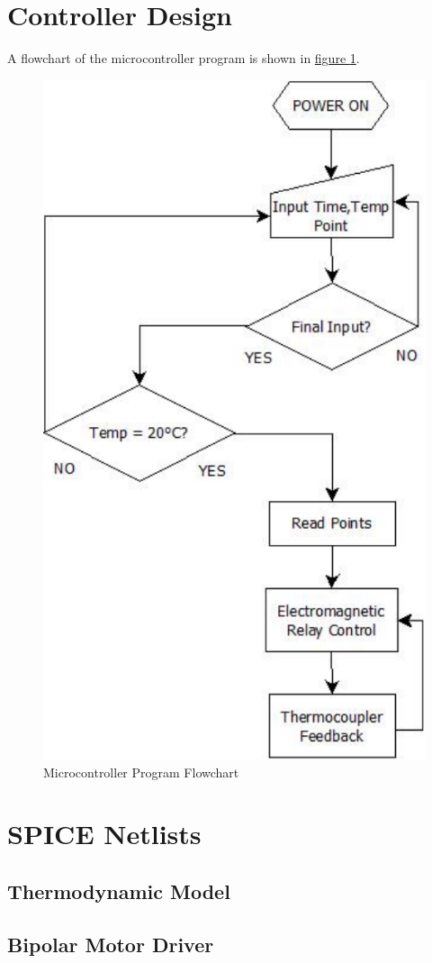 \documentclass[10pt, twocolumn]{article}
\begin{document}
\section{Controller Design}

A flowchart of the microcontroller program is shown in
\hyperref[program-flowchart]{figure \ref{program-flowchart}}.

\begin{figure}
	\centering
	\includegraphics[width=0.75\columnwidth]{Figures/program-flowchart.pdf}
	\caption{Microcontroller Program Flowchart}
	\label{program-flowchart}
\end{figure}

\onecolumn
\appendix

\section{SPICE Netlists}

\subsection{Thermodynamic Model}
\label{heat-model-listing}


\subsection{Bipolar Motor Driver}
\label{motor-driver-listing}

\end{document}
